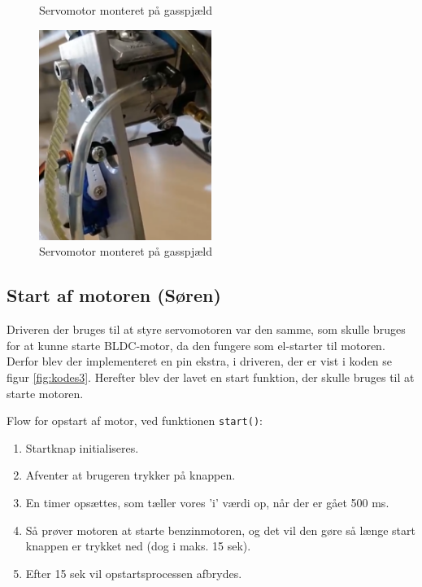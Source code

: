 \begin{figure}[h]
  \centering
  
  \caption{Servomotor monteret på gasspjæld}
  \label{fig:kodes2}
\end{figure}

  
\begin{figure}[h]
  \centering
  \includegraphics[width=0.5\textwidth]{./figurer/mots5.png}
  \caption{Servomotor monteret på gasspjæld}
  \label{fig:mots5}
\end{figure}

  
\subsection{Start af motoren (Søren)}
\label{sec:start-af-motoren}

Driveren der bruges til at styre servomotoren var den samme, som skulle bruges for at kunne starte BLDC-motor, da den fungere som el-starter til motoren. Derfor blev der implementeret en pin ekstra, i driveren, der er vist i koden se figur \ref{fig:kodes3}. Herefter blev der lavet en start funktion, der skulle bruges til at starte motoren.

Flow for opstart af motor, ved funktionen \lstinline{start()}:

\begin{enumerate}
\item Startknap initialiseres.
\item Afventer at brugeren trykker på knappen.
\item En timer opsættes, som tæller vores ’i’ værdi op, når der er gået 500 ms.
\item Så prøver motoren at starte benzinmotoren, og det vil den gøre så længe start knappen er trykket ned (dog i maks. 15 sek).
\item Efter 15 sek vil opstartsprocessen afbrydes.
\end{enumerate}

